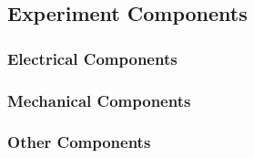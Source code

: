 \begin{landscape}
\subsection{Experiment Components} \label{components}
\label{sec:experiment-components}

\subsubsection{Electrical Components}


% 

\end{landscape}

\begin{landscape}

\subsubsection{Mechanical Components}



% 

\raggedbottom
\end{landscape}

\begin{landscape}
\subsubsection{Other Components}

% 


\raggedbottom
\end{landscape}
